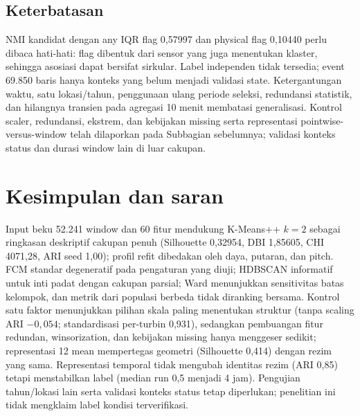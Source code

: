 \documentclass[conference]{IEEEtran}
\begin{document}
\subsection{Keterbatasan}
NMI kandidat dengan any IQR flag 0,57997 dan physical flag 0,10440 perlu dibaca hati-hati: flag dibentuk dari sensor yang juga menentukan klaster, sehingga asosiasi dapat bersifat sirkular. Label independen tidak tersedia; event 69.850 baris hanya konteks yang belum menjadi validasi state. Ketergantungan waktu, satu lokasi/tahun, penggunaan ulang periode seleksi, redundansi statistik, dan hilangnya transien pada agregasi 10 menit membatasi generalisasi. Kontrol scaler, redundansi, ekstrem, dan kebijakan missing serta representasi pointwise-versus-window telah dilaporkan pada Subbagian sebelumnya; validasi konteks status dan durasi window lain di luar cakupan.

\section{Kesimpulan dan saran}
Input beku 52.241 window dan 60 fitur mendukung K-Means++ $k=2$ sebagai ringkasan deskriptif cakupan penuh (Silhouette 0,32954, DBI 1,85605, CHI 4071,28, ARI seed 1,00); profil refit dibedakan oleh daya, putaran, dan pitch. FCM standar degeneratif pada pengaturan yang diuji; HDBSCAN informatif untuk inti padat dengan cakupan parsial; Ward menunjukkan sensitivitas batas kelompok, dan metrik dari populasi berbeda tidak diranking bersama. Kontrol satu faktor menunjukkan pilihan skala paling menentukan struktur (tanpa scaling ARI $-0,054$; standardisasi per-turbin 0,931), sedangkan pembuangan fitur redundan, winsorization, dan kebijakan missing hanya menggeser sedikit; representasi 12 mean mempertegas geometri (Silhouette 0,414) dengan rezim yang sama. Representasi temporal tidak mengubah identitas rezim (ARI 0,85) tetapi menstabilkan label (median run 0,5 menjadi 4 jam). Pengujian tahun/lokasi lain serta validasi konteks status tetap diperlukan; penelitian ini tidak mengklaim label kondisi terverifikasi.
\end{document}
